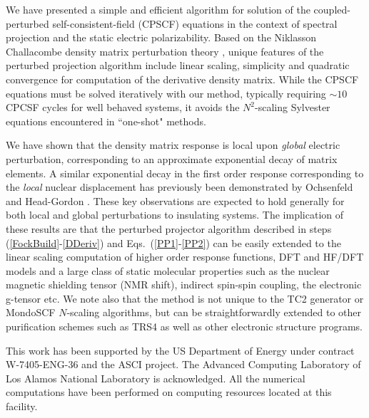\documentclass[prl,aps,twocolumn,showpacs,twocolumngrid,superbib]{revtex4}
\begin{document}
We have presented a simple and efficient algorithm for solution of the coupled-perturbed 
self-consistent-field (CPSCF) equations in the context of spectral projection and the static 
electric polarizability.  Based on the Niklasson Challacombe density matrix perturbation theory \cite{ANiklasson04}, 
unique features of the perturbed projection algorithm include linear scaling, simplicity and 
quadratic convergence for computation of the derivative density matrix.  While the CPSCF 
equations must be solved iteratively with our method, typically requiring $\sim 10$ CPCSF 
cycles for well behaved systems, it avoids the $N^2$-scaling Sylvester equations encountered 
in ``one-shot" methods.

We have shown that the density matrix response is local upon {\em global} electric perturbation, 
corresponding to an approximate exponential decay of matrix elements. A similar exponential decay 
in the first order response corresponding to the {\em local} nuclear displacement has previously been
demonstrated by Ochsenfeld and Head-Gordon \cite{Ochsenfeld_1997}.   These key observations are expected to
hold generally for both local and global perturbations to insulating systems.  The implication of these 
results are that the perturbed projector algorithm described in steps (\ref{FockBuild}-\ref{DDeriv}) and
Eqs.~(\ref{PP1}-\ref{PP2}) can be easily extended to the linear scaling computation of higher order 
response functions, DFT and HF/DFT models and a large class of static molecular properties such as the 
nuclear magnetic shielding tensor (NMR shift), indirect spin-spin coupling, the electronic g-tensor etc.
We note also that the method is not unique to the TC2 generator or {\sc MondoSCF} $N$-scaling algorithms, 
but can be straightforwardly extended to other purification schemes such as TRS4 \cite{ANiklasson03} as
well as other electronic structure programs.


 This work has been supported by the US Department of Energy 
 under contract W-7405-ENG-36 and the ASCI project.  
 The Advanced Computing Laboratory of Los 
 Alamos National Laboratory is acknowledged.
 All the numerical computations have been
 performed on computing resources located at this facility.


\end{document}
